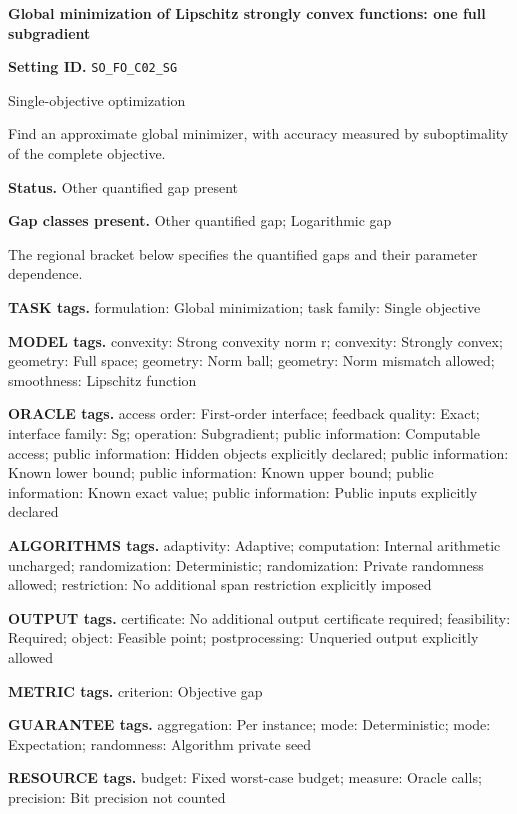 \documentclass[10pt,a4paper]{article}
\begin{document}
\raggedright

{\LARGE\bfseries\sffamily\color{AtlasNavy} Global minimization of Lipschitz strongly convex functions: one full subgradient\par}\vspace{5pt}
\textbf{Setting ID.} \texttt{SO\_\allowbreak{}FO\_\allowbreak{}C02\_\allowbreak{}SG}

Single-objective optimization

Find an approximate global minimizer, with accuracy measured by suboptimality of the complete objective.

\textbf{Status.} Other quantified gap present

\textbf{Gap classes present.} Other quantified gap; Logarithmic gap

The regional bracket below specifies the quantified gaps and their parameter dependence.

\textbf{TASK tags.} formulation: Global minimization; task family: Single objective

\textbf{MODEL tags.} convexity: Strong convexity norm r; convexity: Strongly convex; geometry: Full space; geometry: Norm ball; geometry: Norm mismatch allowed; smoothness: Lipschitz function

\textbf{ORACLE tags.} access order: First-order interface; feedback quality: Exact; interface family: Sg; operation: Subgradient; public information: Computable access; public information: Hidden objects explicitly declared; public information: Known lower bound; public information: Known upper bound; public information: Known exact value; public information: Public inputs explicitly declared

\textbf{ALGORITHMS tags.} adaptivity: Adaptive; computation: Internal arithmetic uncharged; randomization: Deterministic; randomization: Private randomness allowed; restriction: No additional span restriction explicitly imposed

\textbf{OUTPUT tags.} certificate: No additional output certificate required; feasibility: Required; object: Feasible point; postprocessing: Unqueried output explicitly allowed

\textbf{METRIC tags.} criterion: Objective gap

\textbf{GUARANTEE tags.} aggregation: Per instance; mode: Deterministic; mode: Expectation; randomness: Algorithm private seed

\textbf{RESOURCE tags.} budget: Fixed worst-case budget; measure: Oracle calls; precision: Bit precision not counted
\end{document}

